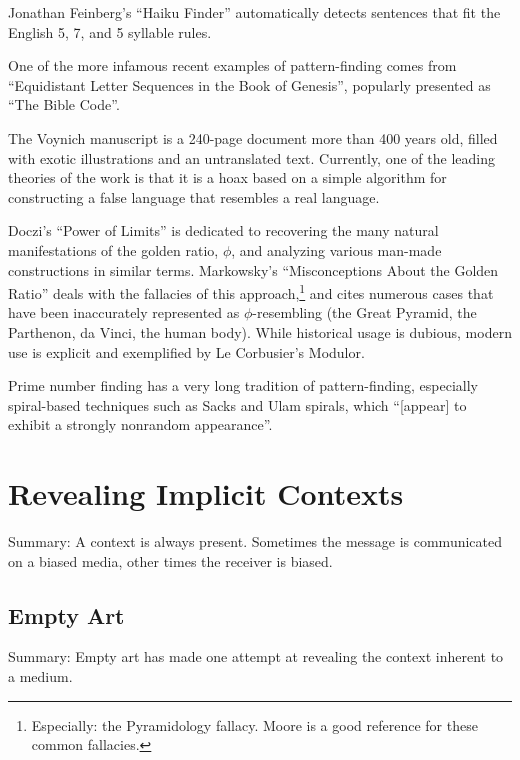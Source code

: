 \documentclass{thesis}
\begin{document}
	Jonathan Feinberg's ``Haiku Finder''\cite{jonathan_feinberg_haiku_????} automatically detects sentences that fit the English 5, 7, and 5 syllable rules.
		
	One of the more infamous recent examples of pattern-finding comes from ``Equidistant Letter Sequences in the Book of Genesis''\cite{rips_equidistant_1994}, popularly presented as ``The Bible Code''.
	
	The Voynich manuscript is a 240-page document more than 400 years old, filled with exotic illustrations and an untranslated text. Currently, one of the leading theories of the work is that it is a hoax based on a simple algorithm for constructing a false language that resembles a real language.\cite{robin_mckie_secret_2004}
		
	Doczi's ``Power of Limits''\cite{Doczi81} is dedicated to recovering the many natural manifestations of the golden ratio, $\phi$, and analyzing various man-made constructions in similar terms. Markowsky's ``Misconceptions About the Golden Ratio''\cite{markowsky_misconceptions_1992} deals with the fallacies of this approach,\footnote{Especially: the Pyramidology fallacy. Moore\cite{Moore07} is a good reference for these common fallacies.} and cites numerous cases that have been inaccurately represented as $\phi$-resembling (the Great Pyramid, the Parthenon, da Vinci, the human body). While historical usage is dubious, modern use is explicit and exemplified by Le Corbusier's Modulor.\cite{padovan_proportion_1999}
	
	Prime number finding has a very long tradition of pattern-finding, especially spiral-based techniques such as Sacks\cite{michael_m._ross_natural_2007} and Ulam\cite{weisstein_prime_????} spirals, which ``[appear] to exhibit a strongly nonrandom appearance''.
	
\chapter{Revealing Implicit Contexts}
	
	Summary: A context is always present. Sometimes the message is communicated on a biased media, other times the receiver is biased.

\section{Empty Art}

	Summary: Empty art has made one attempt at revealing the context inherent to a medium.
\end{document}
